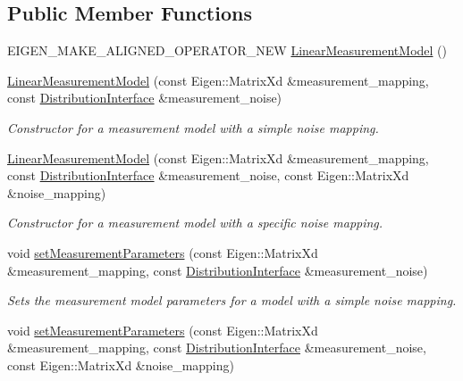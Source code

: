 \subsection*{Public Member Functions}
\begin{DoxyCompactItemize}
\item 
E\+I\+G\+E\+N\+\_\+\+M\+A\+K\+E\+\_\+\+A\+L\+I\+G\+N\+E\+D\+\_\+\+O\+P\+E\+R\+A\+T\+O\+R\+\_\+\+N\+EW \hyperlink{classrefill_1_1LinearMeasurementModel_a90e4ff5a3fd39b3c727b389320ec1e41}{Linear\+Measurement\+Model} ()
\item 
\hyperlink{classrefill_1_1LinearMeasurementModel_ab1b3cb8e8a8e6bc1f311b9cdb96da8b7}{Linear\+Measurement\+Model} (const Eigen\+::\+Matrix\+Xd \&measurement\+\_\+mapping, const \hyperlink{classrefill_1_1DistributionInterface}{Distribution\+Interface} \&measurement\+\_\+noise)
\begin{DoxyCompactList}\small\item\em Constructor for a measurement model with a simple noise mapping. \end{DoxyCompactList}\item 
\hyperlink{classrefill_1_1LinearMeasurementModel_a62be4c770b995a76d9ddf2b8c1e39b4b}{Linear\+Measurement\+Model} (const Eigen\+::\+Matrix\+Xd \&measurement\+\_\+mapping, const \hyperlink{classrefill_1_1DistributionInterface}{Distribution\+Interface} \&measurement\+\_\+noise, const Eigen\+::\+Matrix\+Xd \&noise\+\_\+mapping)
\begin{DoxyCompactList}\small\item\em Constructor for a measurement model with a specific noise mapping. \end{DoxyCompactList}\item 
void \hyperlink{classrefill_1_1LinearMeasurementModel_a4086510d927ce6ad15a94fe7d4fd1a71}{set\+Measurement\+Parameters} (const Eigen\+::\+Matrix\+Xd \&measurement\+\_\+mapping, const \hyperlink{classrefill_1_1DistributionInterface}{Distribution\+Interface} \&measurement\+\_\+noise)
\begin{DoxyCompactList}\small\item\em Sets the measurement model parameters for a model with a simple noise mapping. \end{DoxyCompactList}\item 
void \hyperlink{classrefill_1_1LinearMeasurementModel_aa514c963fd37c9aed1b2f60f833fa472}{set\+Measurement\+Parameters} (const Eigen\+::\+Matrix\+Xd \&measurement\+\_\+mapping, const \hyperlink{classrefill_1_1DistributionInterface}{Distribution\+Interface} \&measurement\+\_\+noise, const Eigen\+::\+Matrix\+Xd \&noise\+\_\+mapping)

\end{DoxyCompactItemize}
